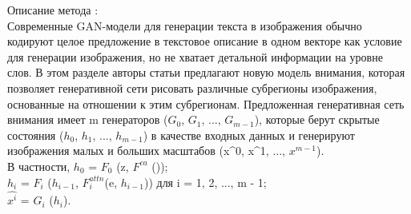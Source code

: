 \documentclass{article}
\begin{document}
Описание метода :\\
Современные GAN-модели для генерации текста в изображения обычно кодируют целое предложение в текстовое описание в одном векторе как условие для генерации изображения, но не хватает детальной информации на уровне слов. В этом разделе авторы статьи предлагают новую модель внимания, которая позволяет генеративной сети рисовать различные субрегионы изображения, основанные на отношении к этим субрегионам.
Предложенная генеративная сеть внимания имеет m генераторов ($G_{0}$, $G_{1}$, ..., $G_{m - 1}$), которые берут скрытые состояния ($h_{0}$, $h_{1}$, ..., $h_{m - 1}$) в качестве входных данных и генерируют изображения малых и больших масштабов (x^0, x^1, ..., $x^{m − 1}$).\\
В частности,
$h_{0}$ = $F_{0}$ (z, $F^{ca}$ ());\\
$h_{i}$ = $F_{i}$ ($h_{i - 1}$, $F^{attn}_{i} $(e, $h_{i - 1}$)) для i = 1, 2, ..., m - 1;\\
$\hat{x^i}$ = $G_{i}$ ($h_{i}$).
\end{document}
